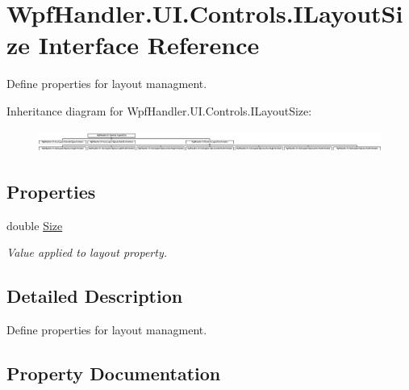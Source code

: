 \hypertarget{interface_wpf_handler_1_1_u_i_1_1_controls_1_1_i_layout_size}{}\section{Wpf\+Handler.\+U\+I.\+Controls.\+I\+Layout\+Size Interface Reference}
\label{interface_wpf_handler_1_1_u_i_1_1_controls_1_1_i_layout_size}


Define properties for layout managment.  


Inheritance diagram for Wpf\+Handler.\+U\+I.\+Controls.\+I\+Layout\+Size\+:\begin{figure}[H]
\begin{center}
\leavevmode
\includegraphics[height=0.727273cm]{d6/d39/interface_wpf_handler_1_1_u_i_1_1_controls_1_1_i_layout_size}
\end{center}
\end{figure}
\subsection*{Properties}
\begin{DoxyCompactItemize}
\item 
double \mbox{\hyperlink{interface_wpf_handler_1_1_u_i_1_1_controls_1_1_i_layout_size_ab6305d7396e1e85d864d110db689331f}{Size}}
\begin{DoxyCompactList}\small\item\em Value applied to layout property. \end{DoxyCompactList}\end{DoxyCompactItemize}


\subsection{Detailed Description}
Define properties for layout managment. 



\subsection{Property Documentation}
\mbox{\label{interface_wpf_handler_1_1_u_i_1_1_controls_1_1_i_layout_size_ab6305d7396e1e85d864d110db689331f}} 
